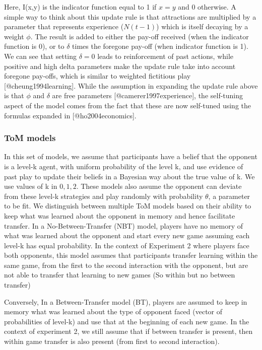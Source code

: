 \documentclass[man,floatsintext]{apa6}
\begin{document}
Here, I(x,y) is the indicator function equal to 1 if \(x = y\) and 0 otherwise. A simple way to think about this update rule is that attractions are multiplied by a parameter that represents experience (\(N(t-1)\)) which is itself decaying by a weight \(\phi\). The result is added to either the pay-off received (when the indicator function is 0), or to \(\delta\) times the foregone pay-off (when indicator function is 1). We can see that setting \(\delta = 0\) leads to reinforcement of past actions, while positive and high delta parameters make the update rule take into account foregone pay-offs, which is similar to weighted fictitious play {[}@cheung1994learning{]}.
While the assumption in expanding the update rule above is that \(\phi\) and \(\delta\) are free parameters {[}@camerer1997experience{]}, the self-tuning aspect of the model comes from the fact that these are now self-tuned using the formulas expanded in {[}@ho2004economics{]}.

\hypertarget{tom-models}{%
\subsubsection{ToM models}\label{tom-models}}

In this set of models, we assume that participants have a belief that the opponent is a level-k agent, with uniform probability of the level k, and use evidence of past play to update their beliefs in a Bayesian way about the true value of k. We use values of k in \({0,1,2}\). These models also assume the opponent can deviate from these level-k strategies and play randomly with probability \(\theta\), a parameter to be fit. We distinguish between multiple ToM models based on their ability to keep what was learned about the opponent in memory and hence facilitate transfer. In a No-Between-Transfer (NBT) model, players have no memory of what was learned about the opponent and start every new game assuming each level-k has equal probability. In the context of Experiment 2 where players face both opponents, this model assumes that participants transfer learning within the same game, from the first to the second interaction with the opponent, but are not able to transfer that learning to new games (So within but no between transfer)

Conversely, In a Between-Transfer model (BT), players are assumed to keep in memory what was learned about the type of opponent faced (vector of probabilities of level-k) and use that at the beginning of each new game. In the context of experiment 2, we still assume that if between transfer is present, then within game transfer is also present (from first to second interaction).
\end{document}
